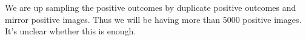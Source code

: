 \documentclass[conference,compsoc]{IEEEtran}
\begin{document}
We are up sampling the positive outcomes by duplicate positive outcomes and mirror positive images. Thus we will be having more than 5000 positive images. It's unclear whether this is enough.
        



\end{document}
